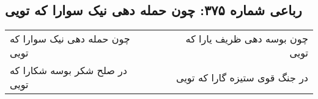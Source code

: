 \begin{center}
\section*{رباعی شماره ۳۷۵: چون حمله دهی نیک سوارا که تویی}
\label{sec:sh375}
\begin{longtable}{l p{0.5cm} r}
چون حمله دهی نیک سوارا که تویی
&&
چون بوسه دهی ظریف یارا که تویی
\\
در صلح شکر بوسه شکارا که تویی
&&
در جنگ قوی ستیزه گارا که تویی
\\
\end{longtable}
\end{center}
